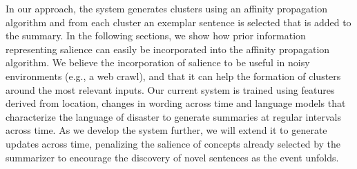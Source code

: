 \documentclass{sig-alternate} \usepackage{url} \usepackage{color}
\begin{document}





%
%
%
%
%

In our approach, the system generates clusters using an affinity propagation
algorithm and from each cluster an exemplar sentence is selected that is added
to the summary.  In the following sections, we show how  prior information
representing salience can easily be incorporated into the affinity propagation
algorithm.  We believe the incorporation of salience to be useful in noisy
environments (e.g., a web crawl), and that it can help the formation of
clusters around the most relevant inputs. Our current system  is trained using
features derived from location, changes in wording across time and language
models that characterize the language of disaster to generate summaries at
regular intervals across time.  As we develop the system further, we will
extend it to generate updates across time,  penalizing the salience of
concepts already selected by the summarizer to encourage the discovery of
novel sentences as the event unfolds. 
\end{document}
